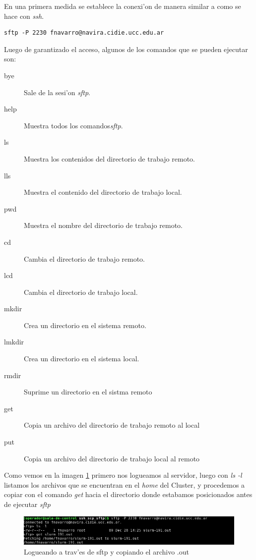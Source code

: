 \documentclass[a4paper]{scrartcl}
\newcommand{\BashFancyFormatLine}{%
  \def\FancyVerbFormatLine##1{\$\,##1}%
}
\begin{document}
En una primera medida se establece la conexi'on de manera similar a como se hace con \textit{ssh}.

\begin{verbatim}
sftp -P 2230 fnavarro@navira.cidie.ucc.edu.ar
\end{verbatim}

Luego de garantizado el acceso, algunos de los comandos que se pueden ejecutar son:
\begin{description}
	\item[bye]	Sale de la sesi'on \textit{sftp}.
	\item[help]	Muestra todos los comandos\textit{sftp}.
	\item[ls]	Muestra los contenidos del directorio de trabajo remoto.
	\item[lls]	Muestra el contenido del directorio de trabajo local.
	\item[pwd]	Muestra el nombre del directorio de trabajo remoto.
	\item[cd]	Cambia el directorio de trabajo remoto.
	\item[lcd]	Cambia el directorio de trabajo local.
	\item[mkdir]	Crea un directorio en el sistema remoto.
	\item[lmkdir]	Crea un directorio en el sistema local.
	\item[rmdir]	Suprime un directorio en el sistma remoto
	\item[get]	Copia un archivo del directorio de trabajo remoto al local
	\item[put]	Copia un archivo del directorio de trabajo local al remoto
		
\end{description}

Como vemos en la imagen \ref{fig:sftp_1} primero nos logueamos al servidor, luego con \textit{ls -l} listamos los archivos que se encuentran en el \textit{home} del Cluster, y procedemos a copiar con el comando \textit{get} hacia el directorio donde estabamos posicionados antes de ejecutar \textit{sftp}
\begin{figure}[H]
	\includegraphics[width=\columnwidth]{./ssh_scp_sftp_imgs/sftp_1}
	\caption{Logueando a trav'es de sftp y copiando el archivo .out}
	\label{fig:sftp_1}
\end{figure}
\end{document}
